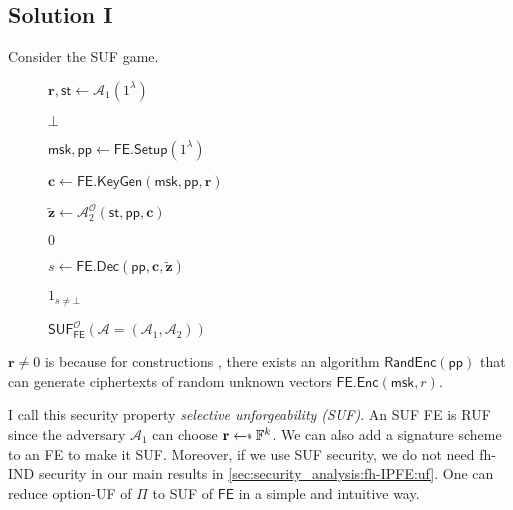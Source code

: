 \subsection{Solution I}
Consider the \textsf{SUF} game.
\begin{figure}[H]
\centering

	\begin{minipage}[t]{0.55\textwidth}
	\begin{algorithm}[H]
	\caption{$\textsf{SUF}^{\mathcal{O}}_{\textsf{FE}}(\mathcal{A} = (\mathcal{A}_1, \mathcal{A}_2))$}
	\begin{algorithmic}[1]
		\State $\mathbf{r}, \textsf{st} \gets \mathcal{A}_1(1^\lambda)$

			\State \Return $\bot$
		\EndIf

		\State $\textsf{msk}, \textsf{pp} \gets \textsf{FE.Setup}(1^\lambda)$

		\State $\mathbf{c} \gets \textsf{FE.KeyGen}(\textsf{msk}, \textsf{pp}, \mathbf{r})$

		\State $\mathbf{\tilde{z}} \gets \mathcal{A}_2^{\mathcal{O}} ( \textsf{st}, \textsf{pp}, \mathbf{c} )$

			
			\State \Return $0$
		
		\EndIf

		\State $s \gets \textsf{FE.Dec}(\textsf{pp}, \mathbf{c}, \mathbf{\tilde{z}} )$

		\State \Return $1_{s \neq \bot}$
	\end{algorithmic}
	\end{algorithm}
	\end{minipage}

\end{figure}

$\mathbf{r} \neq 0$ is because for constructions \cite{10.1007/978-3-319-45871-7_24, cryptoeprint:2016/440}, there exists an algorithm $\textsf{RandEnc}(\textsf{pp})$ that can generate ciphertexts of random unknown vectors $\textsf{FE.Enc}(\textsf{msk}, r)$.

I call this security property \emph{selective unforgeability (SUF)}. An SUF \textsf{FE} is RUF since the adversary $\mathcal{A}_1$ can choose $\mathbf{r} \getsdollar \mathbb{F}^k$. We can also add a signature scheme to an \textsf{FE} to make it SUF. Moreover, if we use SUF security, we do not need fh-IND security in our main results in \ref{sec:security_analysis:fh-IPFE:uf}. One can reduce \textsf{option}-\textsf{UF} of $\Pi$ to \textsf{SUF} of $\textsf{FE}$ in a simple and intuitive way.

